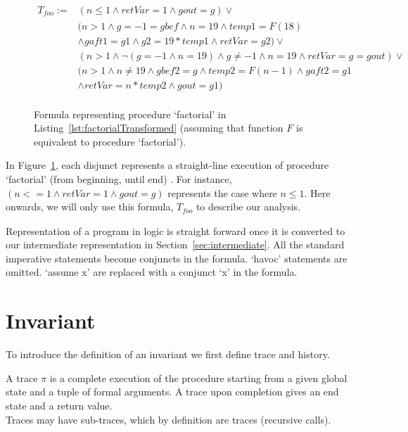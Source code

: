 \documentclass{llncs}
\newcommand{\foo}{\textit{foo}}
\newcommand{\trace}{\pi}
\newcommand{\pathCondition}{\mathit{T_{\foo}}}
\newcommand{\F}{\mathit{F}}
\begin{document}
\begin{figure}
  \begin{align*}
    \pathCondition :=
    &(n \leq 1 \wedge retVar = 1 \wedge gout = g) \vee \\
    &(n > 1 \wedge g = -1 = gbef \wedge n = 19 \wedge temp1 = \F(18) \\
    &\wedge gaft1 = g1 \wedge g2 = 19 * temp1
    \wedge retVar = g2) \vee\\
    &(n > 1 \wedge \neg( g = -1 \wedge n = 19) \wedge g \neq -1
    \wedge n = 19 \wedge retVar = g = gout) \vee\\
    &(n > 1 \wedge n \neq 19 \wedge gbef2 = g \wedge temp2 = \F( n
    - 1) \wedge gaft2 = g1\\
    &\wedge retVar = n * temp2 \wedge gout = g1)\\
  \end{align*}
  \caption{Formula representing procedure `factorial' in
    Listing~\ref{lst:factorialTransformed} (assuming that function
    $\F$ is equivalent to procedure `factorial').}
  \label{fig:pathCondition}
\end{figure}

In Figure~\ref{fig:pathCondition}, each disjunct represents a
straight-line execution of procedure `factorial' (from beginning,
until end) . For instance, $(n <= 1
\wedge retVar = 1 \wedge gout = g)$ represents the case where $n \leq
1$. Here onwards, we will only use this formula, $\pathCondition$ to
describe our analysis.



Representation of a program in logic is straight forward once it is
converted to our intermediate representation in
Section~\ref{sec:intermediate}. All the standard imperative statements
become conjuncts in the formula. `havoc' statements are omitted.
`assume x' are replaced with a conjunct `x' in the formula.

\section{Invariant}

To introduce the definition of an invariant we first define trace and
history.

\begin{definition}[trace]
  A trace $\trace$ is a complete execution of the procedure starting
  from a given global state and a tuple of formal arguments. A trace
  upon completion gives an end state and a return value.\\ 
 Traces may have sub-traces, which by definition are traces
  (recursive calls).
\end{definition}
\end{document}
